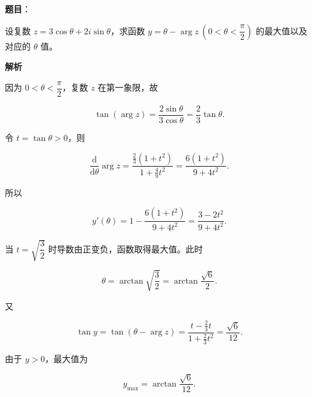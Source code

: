 \begin{answer}

\textbf{题目}：

设复数 $z=3\cos\theta+2i\sin\theta$，求函数 $y=\theta-\arg z\ \left(0<\theta<\dfrac\pi2\right)$ 的最大值以及对应的 $\theta$ 值。

\textbf{解析}

因为 $0<\theta<\dfrac\pi2$，复数 $z$ 在第一象限，故

\nopagebreak[4]
\[
\tan(\arg z)=\frac{2\sin\theta}{3\cos\theta}
=\frac23\tan\theta.
\]

令 $t=\tan\theta>0$，则

\nopagebreak[4]
\[
\frac{\mathrm d}{\mathrm d\theta}\arg z
=\frac{\frac23(1+t^2)}{1+\frac49t^2}
=\frac{6(1+t^2)}{9+4t^2}.
\]

所以

\nopagebreak[4]
\[
y'(\theta)
=1-\frac{6(1+t^2)}{9+4t^2}
=\frac{3-2t^2}{9+4t^2}.
\]

当 $t=\sqrt{\dfrac32}$ 时导数由正变负，函数取得最大值。此时

\nopagebreak[4]
\[
\theta=\arctan\sqrt{\frac32}
=\arctan\frac{\sqrt6}{2}.
\]

又

\nopagebreak[4]
\[
\tan y
=\tan(\theta-\arg z)
=\frac{t-\frac23t}{1+\frac23t^2}
=\frac{\sqrt6}{12}.
\]

由于 $y>0$，最大值为

\nopagebreak[4]
\[
y_{\max}=\arctan\frac{\sqrt6}{12}.
\]


\end{answer}
